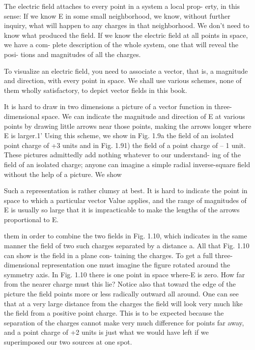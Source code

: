 The electric field attaches to every point in a system a local prop-
erty, in this sense: If we know E in some small neighborhood, we
know, without further inquiry, what will happen to any charges in
that neighborhood. We don't need to know what produced the field.
If we know the electric field at all points in space, we have a com-
plete description of the whole system, one that will reveal the posi-
tions and magnitudes of all the charges.

To visualize an electric field, you need to associate a vector, that is,
a magnitude and direction, with every point in space. We shall use
various schemes, none of them wholly satisfactory, to depict vector
fields in this book.

It is hard to draw in two dimensions a picture of a vector function
in three-dimensional space. We can indicate the magnitude and
direction of E at various points by drawing little arrows near those
points, making the arrows longer where E is larger.1' Using this
scheme, we show in Fig. 1.9a the field of an isolated point charge of
+3 units and in Fig. 1.91) the field of a point charge of -- 1 unit.
These pictures admittedly add nothing whatever to our understand-
ing of the field of an isolated charge; anyone can imagine a simple
radial inverse-square field without the help of a picture. We show

Such a representation is rather clumsy at best. It is hard to indicate the point in
space to which a particular vector Value applies, and the range of magnitudes of E is
usually so large that it is impracticable to make the lengths of the arrows proportional
to E.

them in order to combine the two fields in Fig. 1.10, which indicates
in the same manner the field of two such charges separated by a
distance a. All that Fig. 1.10 can show is the field in a plane con-
taining the charges. To get a full three-dimensional representation
one must imagine the figure rotated around the symmetry axis. In
Fig. 1.10 there is one point in space where-E is zero. How far from
the nearer charge must this lie? Notice also that toward the edge of
the picture the field points more or less radically outward all around.
One can see that at a very large distance from the charges the field
will look very much like the field from a positive point charge. This
is to be expected because the separation of the charges cannot make
very much difference for points far away, and a point charge of +2
units is just what we would have left if we superimposed our two
sources at one spot.

